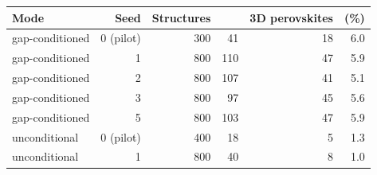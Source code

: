 \begin{tabular}{@{}lrrrrr@{}}\toprule
 Mode & Seed & Structures & \ABX{} & 3D perovskites & (\%) \\\midrule
gap-conditioned & 0 (pilot) & 300 & 41 & 18 & 6.0 \\
gap-conditioned & 1 & 800 & 110 & 47 & 5.9 \\
gap-conditioned & 2 & 800 & 107 & 41 & 5.1 \\
gap-conditioned & 3 & 800 & 97 & 45 & 5.6 \\
gap-conditioned & 5 & 800 & 103 & 47 & 5.9 \\
unconditional & 0 (pilot) & 400 & 18 & 5 & 1.3 \\
unconditional & 1 & 800 & 40 & 8 & 1.0 \\
\bottomrule\end{tabular}

